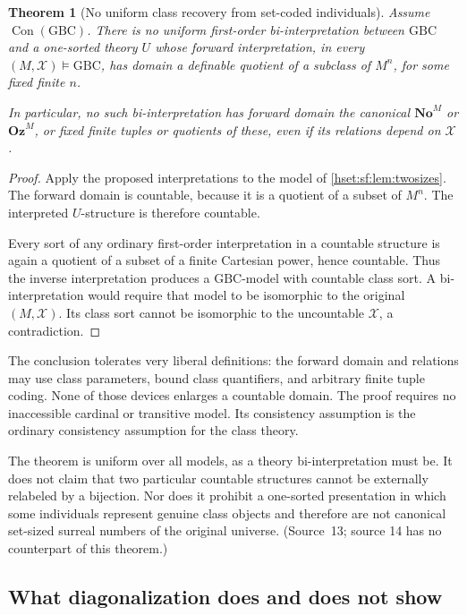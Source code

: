 \documentclass[11pt,letterpaper]{article}
\newtheorem{theorem}{Theorem}[section]
\theoremstyle{definition}
\theoremstyle{remark}
\newcommand{\No}{\mathbf{No}}
\newcommand{\Oz}{\mathbf{Oz}}
\newcommand{\GBC}{\mathrm{GBC}}
\newcommand{\Con}{\operatorname{Con}}
\begin{document}
\begin{theorem}[No uniform class recovery from set-coded individuals]
\label{hset:sf:thm:canonicalclassnogo}
Assume $\Con(\GBC)$. There is no uniform first-order bi-interpretation between
$\GBC$ and a one-sorted theory $U$ whose forward interpretation, in every
$(M,\mathcal X)\models\GBC$, has domain a definable quotient of a subclass of
$M^n$, for some fixed finite $n$.

In particular, no such bi-interpretation has forward domain the canonical $\No^M$
or $\Oz^M$, or fixed finite tuples or quotients of these, even if its relations
depend on $\mathcal X$.
\end{theorem}
\begin{proof}
Apply the proposed interpretations to the model of \cref{hset:sf:lem:twosizes}.
The forward domain is countable, because it is a quotient of a subset of $M^n$. The
interpreted $U$-structure is therefore countable.

Every sort of any ordinary first-order interpretation in a countable structure is
again a quotient of a subset of a finite Cartesian power, hence countable. Thus the
inverse interpretation produces a $\GBC$-model with countable class sort. A
bi-interpretation would require that model to be isomorphic to the original
$(M,\mathcal X)$. Its class sort cannot be isomorphic to the uncountable
$\mathcal X$, a contradiction.
\end{proof}

The conclusion tolerates very liberal definitions: the forward domain and relations
may use class parameters, bound class quantifiers, and arbitrary finite tuple
coding. None of those devices enlarges a countable domain. The proof requires no
inaccessible cardinal or transitive model. Its consistency assumption is the
ordinary consistency assumption for the class theory.

The theorem is uniform over all models, as a theory bi-interpretation must be. It
does not claim that two particular countable structures cannot be externally
relabeled by a bijection. Nor does it prohibit a one-sorted presentation in which
some individuals represent genuine class objects and therefore are not canonical
set-sized surreal numbers of the original universe. (Source~13; source 14 has no
counterpart of this theorem.)

\subsection{What diagonalization does and does not show}
\label{hset:sf:sec:diagonal}
\end{document}
